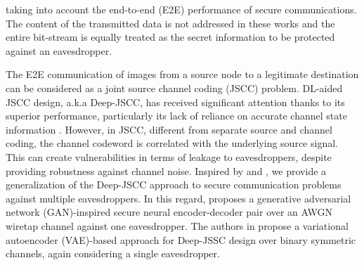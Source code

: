 \documentclass[conference]{IEEEtran}
\begin{document}
	taking into account the end-to-end (E2E) performance of  secure communications.  
	 The content of the transmitted data is not addressed in these works and the entire bit-stream  is equally treated as the secret information to be protected against an eavesdropper.  
	
The E2E communication of images from a source node  to a legitimate destination  can be considered as  a joint source channel coding (JSCC) problem. DL-aided JSCC design, a.k.a  Deep-JSCC, has received significant attention thanks to its  superior performance, particularly its lack of reliance on accurate channel state information \cite{DJSCC-Deniz}.  
	However, in JSCC, different from  separate   source and channel coding, the channel codeword is correlated  with the underlying source signal.  This can create vulnerabilities  in terms of leakage to eavesdroppers, despite  providing robustness against channel noise. 
	Inspired by \cite{AE-Deniz} and \cite{Ecenaz-icassp}, we provide a generalization of the Deep-JSCC approach   to secure communication problems against multiple eavesdroppers.
		In this regard, \cite{AE-Deniz} proposes  a generative adversarial network (GAN)-inspired secure neural encoder-decoder pair  over an AWGN wiretap  channel  against one eavesdropper.   The authors in \cite{Ecenaz-icassp}  propose  a variational autoencoder (VAE)-based approach for Deep-JSSC design  over binary symmetric channels, again considering  a single eavesdropper.  
		
\end{document}

